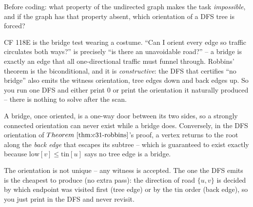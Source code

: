 \begin{attemptgate}
Before coding: what property of the undirected graph makes the task
\emph{impossible}, and if the graph has that property absent, which orientation of a DFS
tree is forced?
\end{attemptgate}

CF 118E is the bridge test wearing a costume.  ``Can I orient every edge so traffic
circulates both ways?'' is precisely ``is there an unavoidable road?'' -- a bridge is exactly
an edge that all one-directional traffic must funnel through.  Robbins' theorem is the biconditional,
and it is \emph{constructive}: the DFS that certifies ``no bridge'' also emits the witness
orientation, tree edges down and back edges up.  So you run one DFS and either print \(0\) or
print the orientation it naturally produced -- there is nothing to solve after the scan.

\begin{observation}
A bridge, once oriented, is a one-way door between its two sides, so a strongly connected
orientation can never exist while a bridge does.  Conversely, in the DFS orientation of
\(\thmref{c31-robbins}\)'s proof, a vertex returns to the root along the \emph{back edge}
that escapes its subtree -- which is guaranteed to exist exactly because
\(\mathrm{low}[v]\le\mathrm{tin}[u]\) says no tree edge is a bridge.
\end{observation}
\begin{observation}
The orientation is not unique -- any witness is accepted.  The one the DFS emits is the
cheapest to produce (no extra pass): the direction of road \(\{u,v\}\) is decided by which
endpoint was visited first (tree edge) or by the \(\mathrm{tin}\) order (back edge), so you
just print in the DFS and never revisit.
\end{observation}

